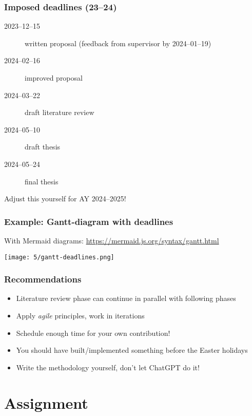 \documentclass[aspectratio=169]{beamer}
\begin{document}
\begin{frame}
  \frametitle{Imposed deadlines (23--24)}

  \begin{description}
    \item[2023--12--15] written proposal (feedback from supervisor by 2024--01--19)
    \item[2024--02--16] improved proposal
    \item[2024--03--22] draft literature review
    \item[2024--05--10] draft thesis
    \item[2024--05--24] final thesis
  \end{description}

  \medskip

  Adjust this yourself for AY 2024--2025!
\end{frame}

\begin{frame}[plain]
  \frametitle{Example: Gantt-diagram with deadlines}

  With Mermaid diagrams: \url{https://mermaid.js.org/syntax/gantt.html}

  \centering
  \texttt{[image: 5/gantt-deadlines.png]}
\end{frame}

\begin{frame}
  \frametitle{Recommendations}

  \begin{itemize}
    \item Literature review phase can continue in parallel with following phases
    \item Apply \textit{agile} principles, work in iterations
    \item Schedule enough time for your own contribution!
    \item You should have built/implemented something before the Easter holidays
    \item Write the methodology yourself, don't let ChatGPT do it!
  \end{itemize}
\end{frame}
\section{Assignment}
\end{document}
